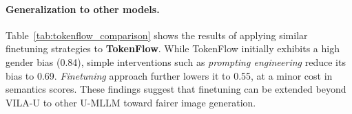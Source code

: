 \vspace{-1em}
\paragraph{Generalization to other models.}

Table~\ref{tab:tokenflow_comparison} shows the results of applying similar finetuning strategies to \textbf{TokenFlow}. While TokenFlow initially exhibits a high gender bias (0.84), simple interventions such as \emph{prompting engineering} reduce its bias to 0.69.  \emph{Finetuning} approach further lowers it to 0.55, at a minor cost in semantics scores. These findings suggest that finetuning can be extended beyond VILA-U to other U-MLLM toward fairer image generation.


